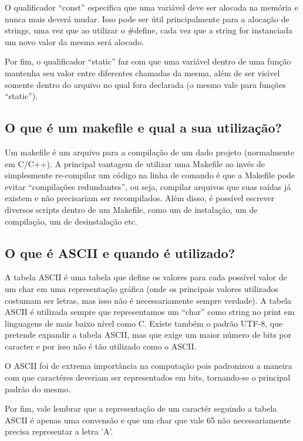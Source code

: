 \documentclass[11pt]{article}
\begin{document}
  O qualificador ``const'' especifica que uma variável deve ser alocada na
  memória e nunca mais deverá mudar. Isso pode ser útil principalmente para a
  alocação de strings, uma vez que ao utilizar o #define, cada vez que a string
  for instanciada um novo valor da mesma será alocado.

  Por fim, o qualificador ``static'' faz com que uma variável dentro de uma
  função mantenha seu valor entre diferentes chamadas da mesma, além de ser
  visivel somente dentro do arquivo no qual fora declarada (o mesmo vale para
  funções ``static'').

  \subsection{O que é um makefile e qual a sua utilização?}
\label{sec:orgheadline4}
  Um makefile é um arquivo para a compilação de um dado projeto (normalmente em
  C/C++). A principal vantagem de utilizar uma Makefile ao invés de simplesmente
  re-compilar um código na linha de comando é que a Makefile pode evitar
  ``compilações redundantes'', ou seja, compilar arquivos que suas saídas já
  existem e não precisariam ser recompilados. Além disso, é possível escrever
  diversos scripts dentro de um Makefile, como um de instalação, um de
  compilação, um de desinstalação etc.

  \subsection{O que é ASCII e quando é utilizado?}
\label{sec:orgheadline4}
  A tabela ASCII é uma tabela que define os valores para cada possível valor de
  um char em uma representação gráfica (onde os principais valores utilizados
  costumam ser letras, mas isso não é necessariamente sempre verdade). A tabela
  ASCII é utilizada sempre que representamos um ``char'' como string no print em
  linguagens de mais baixo nível como C. Existe também o padrão UTF-8, que
  pretende expandir a tabela ASCII, mas que exige um maior número de bits por
  caracter e por isso não é tão utilizado como o ASCII.

  O ASCII foi de extrema importância na computação pois padronizou a maneira com
  que caractéres deveriam ser representados em bits, tornando-se o principal
  padrão do mesmo.

  Por fim, vale lembrar que a representação de um caractér seguindo a tabela
  ASCII é apenas uma convensão e que um char que vale 65 não necessariamente
  precisa representar a letra 'A'.
\end{document}

